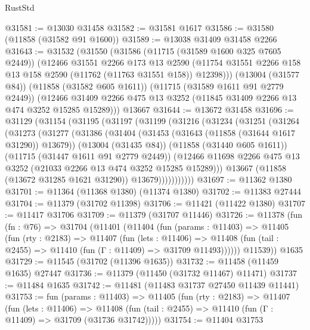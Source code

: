 \begin{lexlean}{RustStd}
\begin{coremodule}
@31581 := @13030 @31458
@31582 := @31581 @1617
@31586 := @31580 (@11858 (@31582 @91 @1600))
@31589 := @13038 @31409 @31458 @2266
@31643 := @31532
    (@31550
      (@31586
        (@11715 (@31589 @1600 @325 @7605 @2449))
        (@12466
          @31551
          @2266
          @173
          @13
          @2590
          (@11754 @31551 @2266 @158 @13 @158 @2590 (@11762 (@11763 @31551 @158)) @12398)))
      (@13004 (@31577 @84))
      (@11858 (@31582 @605 @1611))
      (@11715 (@31589 @1611 @91 @2779 @2449))
      (@12466 @31409 @2266 @475 @13 @3252 (@11845 @31409 @2266 @13 @474 @3252 @15285 @15289)))
    @13667
@31644 := @13672 @31458
@31696 := @31129
    (@31154
      (@31195
        (@31197
          (@31199
            (@31216
              (@31234
                (@31251
                  (@31264
                    (@31273
                      (@31277
                        (@31386
                          (@31404
                            (@31453 (@31643 (@11858 (@31644 @1617 @31290)) @13679))
                            (@13004 (@31435 @84))
                            (@11858 (@31440 @605 @1611))
                            (@11715 (@31447 @1611 @91 @2779 @2449))
                            (@12466
                              @11698
                              @2266
                              @475
                              @13
                              @3252
                              (@21033 @2266 @13 @474 @3252 @15285 @15289)))
                          @13667
                          (@11858 (@13672 @31285 @1621 @31290))
                          @13679)))))))))))
@31697 := @11362 @1380
@31701 := @11364 (@11368 @1380) (@11374 @1380)
@31702 := @11383 @27444
@31704 := @11379 (@31702 @11398)
@31706 := @11421 (@11422 @1380)
@31707 := @11417 @31706
@31709 := @11379 (@31707 @11446)
@31726 := @11378
    (fun (fn : @76) =>
    @31704
      (@11401
        (@11404
          (fun (params : @11403) =>
          @11405
            (fun (rty : @2183) =>
            @11407
              (fun (lets : @11406) =>
              @11408 (fun (tail : @2455) => @11410 (fun (Γ : @11409) => @31709 @11493))))))
        @11539))
    @1635
@31729 := @11545 (@31702 (@11396 @1635))
@31732 := @11458 (@11459 @1635) @27447
@31736 := @11379 (@11450 (@31732 @11467) @11471)
@31737 := @11484 @1635
@31742 := @11481 (@11483 @31737 @27450 @11439 @11441)
@31753 := fun (params : @11403) =>
  @11405
    (fun (rty : @2183) =>
    @11407
      (fun (lets : @11406) =>
      @11408 (fun (tail : @2455) => @11410 (fun (Γ : @11409) => @31709 (@31736 @31742)))))
@31754 := @11404 @31753

\end{coremodule}
\end{lexlean}
